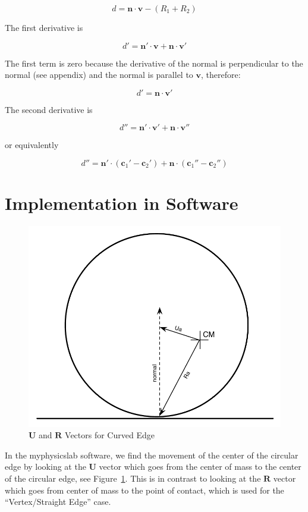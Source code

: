 \documentclass[final]{article}
\begin{document}
\[
  d = \mathbf{n} \cdot \mathbf{v} - (R_1 + R_2)
\]

The first derivative is

\[
  d' = \mathbf{n}' \cdot \mathbf{v} + \mathbf{n} \cdot \mathbf{v}'
\]

The first term is zero because the derivative of the normal is perpendicular to the
normal (see appendix) and the normal is parallel to $\mathbf{v}$, therefore:

\[
  d' = \mathbf{n} \cdot \mathbf{v}'
\]

The second derivative is

\[
  d'' = \mathbf{n}' \cdot \mathbf{v}' + \mathbf{n} \cdot \mathbf{v}''
\]

or equivalently

\begin{equation}\label{accel_circle_circle}
  d'' = \mathbf{n}' \cdot (\mathbf{c}_1' - \mathbf{c}_2')
    + \mathbf{n} \cdot (\mathbf{c}_1'' - \mathbf{c}_2'')
\end{equation}



\section{Implementation in Software}

\begin{figure}[ht]
    \centering
    \includegraphics[width=0.6 \textwidth]{CEP_Equiv_U_R_Vectors.pdf}
    \caption{$\mathbf{U}$ and $\mathbf{R}$ Vectors for Curved Edge}
    \label{fig:CEP_Equiv_U_R_Vectors}
\end{figure}

In the myphysicslab software, we find the movement of the center of the circular edge by
looking at the $\mathbf{U}$ vector which goes from the center of mass to the center of
the circular edge, see Figure~\ref{fig:CEP_Equiv_U_R_Vectors}. This is in contrast to
looking at the $\mathbf{R}$ vector which goes from center of mass to the point of
contact, which is used for the ``Vertex/Straight Edge'' case.
\end{document}
